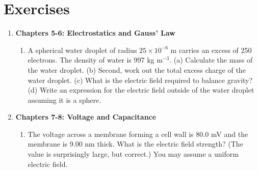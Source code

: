 \documentclass[10pt]{article}
\begin{document}
\clearpage

\section{Exercises}

\begin{enumerate}
\item \textbf{Chapters 5-6: Electrostatics and Gauss' Law}
\begin{enumerate}
\item A spherical water droplet of radius $25 \times 10^{-6}$ m carries an excess of 250 electrons.  The density of water is 997 kg m$^{-3}$.  (a) Calculate the mass of the water droplet. (b) Second, work out the total excess charge of the water droplet.  (c) What is the electric field required to balance gravity? (d) Write an expression for the electric field outside of the water droplet assuming it is a sphere.  \\ \vspace{3.5cm}
\end{enumerate}
\item \textbf{Chapters 7-8: Voltage and Capacitance}
\begin{enumerate}
\item The voltage across a membrane forming a cell wall is 80.0 mV and the membrane is 9.00 nm thick. What is the electric field strength? (The value is surprisingly large, but correct.) You may assume a uniform electric field. \\ \vspace{2cm}

\end{enumerate}
\end{enumerate}
\end{document}
